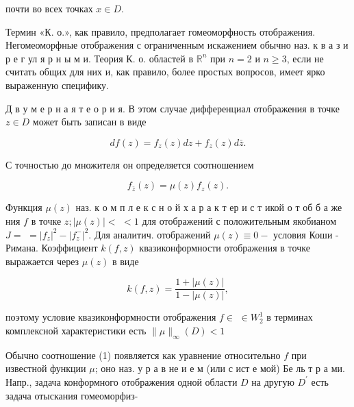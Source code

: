 \documentclass[10pt]{article}
\begin{document}
почти во всех точках $x \in D$.



Термин «К. о.», как правило, предполагает гомеоморфность отображения. Негомеоморфные отображения с ограниченным искажением обычно наз. к в а з и р е г ул я р н ы м и. Теория К. о. областей в $\mathbb{R}^{n}$ при $n=2$ и $n \geqslant 3$, если не считать общих для них и, как правило, более простых вопросов, имеет ярко выраженную специфику.



Д в у м е р н а я т е о р и я. В этом случае дифференциал отображения в точке $z \in D$ может быть записан в виде



\[

d f(z)=f_{z}(z) d z+f_{z}(z) d \bar{z} .

\]



С точностью до множителя он определяется соотношением



\[

f_{\bar{z}}(z)=\mu(z) f_{z}(z) .

\]



Функция $\mu(z)$ наз. к о м п л е к с н о й х а р а к т ер и с т икой о т об б а же ния $f$ в точке $z ;|\mu(z)|<$ $<1$ для отображений с положительным якобианом $J=$ $=\left|f_{z}\right|^{2}-\left|f_{z}^{-}\right|^{2}$. Для аналитич. отображений $\mu(z) \equiv 0-$ условия Коши - Римана. Коэффициент $k(f, z)$ квазиконформности отображения в точке выражается через $\mu(z)$ в виде



\[

k(f, z)=\frac{1+|\mu(z)|}{1-|\mu(z)|},

\]



поэтому условие квазиконформности отображения $f \in$ $\in W_{2}^{1}$ в терминах комплексной характеристики есть $\|\mu\|_{\infty}(D)<1$



Обычно соотношение (1) появляется как уравнение относительно $f$ при известной функции $\mu$; оно наз. у р а в не и е м (или с ист е мой) Бе ль т р а ми. Напр., задача конформного отображения одной области $D$ на другую $D^{\prime}$ есть задача отыскания гомеоморфиз-
\end{document}
